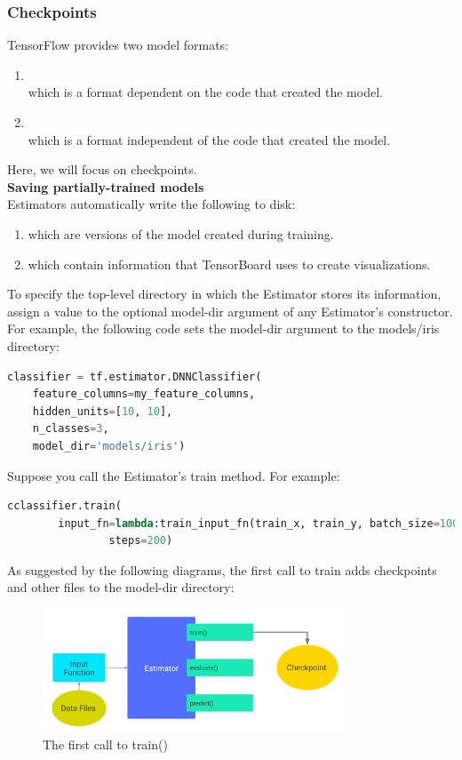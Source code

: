     \subsubsection{Checkpoints}
    TensorFlow provides two model formats:
    \begin{enumerate}
      \item\textcite{checkpoints}\\
      which is a format dependent on the code that created the model.
    \item\textcite{SavedModel}\\ 
    which is a format independent of the code that created the model.
    \end{enumerate}
Here, we will focus on checkpoints.\\
\textbf{Saving partially-trained models}\\
Estimators automatically write the following to disk:
\begin{enumerate}
      \item\textcite{checkpoints, }which are versions of the model created during training.
      \item\textcite{event files, }which contain information that TensorBoard uses to create visualizations.
      \end{enumerate}
      To specify the top-level directory in which the Estimator stores its information, assign a value to the optional model-dir argument of any Estimator's constructor. For example, the following code sets the model-dir argument to the models/iris directory:
      \begin{lstlisting}[language=Python]
classifier = tf.estimator.DNNClassifier(
    feature_columns=my_feature_columns,
    hidden_units=[10, 10],
    n_classes=3,
    model_dir='models/iris')

\end{lstlisting}
Suppose you call the Estimator's train method. For example:
\begin{lstlisting}[language=Python]
cclassifier.train(
        input_fn=lambda:train_input_fn(train_x, train_y, batch_size=100),
                steps=200)

\end{lstlisting}
As suggested by the following diagrams, the first call to train adds checkpoints and other files to the model-dir directory:
\begin{figure}[H]%
    \center%
    \includegraphics[width=0.8\textwidth]{images/eman/first_train_calls.png}%
\caption[This is first train call]{The first call to train()}\label{fig:call}%
  \end{figure}



 
  


      
  


